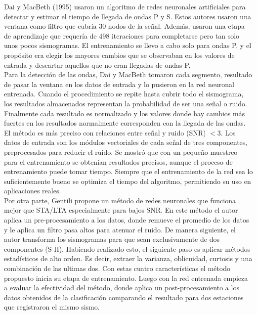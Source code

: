 \documentclass[../main.tex]{subfiles}
\begin{document}
Dai y MacBeth (1995) usaron un algoritmo de redes neuronales artificiales para detectar y estimar el tiempo de llegada de ondas P y S. Estos autores usaron una ventana como filtro que cubría 30 nodos de la señal. Además, usaron una etapa de aprendizaje que requería de 498 iteraciones para completarse pero tan solo unos pocos sismogramas. El entrenamiento se llevo a cabo solo para ondas P, y el propósito era elegir los mayores cambios que se observaban en los valores de entrada y descartar aquellos que no eran llegadas de ondas P. \\

Para la detección de las ondas, Dai y MacBeth tomaron cada segmento, resultado de pasar la ventana en los datos de entrada y lo pusieron en la red neuronal entrenada. Cuando el procedimiento se repite hasta cubrir todo el sismograma, los resultados almacenados representan la probabilidad de ser una señal o ruido. Finalmente cada resultado es normalizado y los valores donde hay cambios más fuertes en los resultados normalmente corresponden con la llegada de las ondas. El método es más preciso con relaciones entre señal y ruido (SNR) $<3$. Los datos de entrada son los módulos vectoriales de cada señal de tres componentes, preprocesados para reducir el ruido. Se mostró que con un pequeño muestreo para el entrenamiento se obtenían resultados precisos, aunque el proceso de entrenamiento puede tomar tiempo. Siempre que el entrenamiento de la red sea lo suficientemente bueno se optimiza el tiempo del algoritmo, permitiendo su uso en aplicaciones reales. \\

Por otra parte, Gentili propone un método de redes neuronales que funciona mejor que STA/LTA especialmente para bajos SNR. En este método el autor aplica un pre-procesamiento a los datos, donde remueve el promedio de los datos y le aplica un filtro pasa altos para atenuar el ruido. De manera siguiente, el autor transforma los sismogramas para que sean exclusivamente de dos componentes (S-H). Habiendo realizado esto, el siguiente paso es aplicar métodos estadísticos de alto orden. Es decir, extraer la varianza, oblicuidad, curtosis y una combinación de las ultimas dos. Con estas cuatro características el método propuesto inicia su etapa de entrenamiento. Luego con la red entrenada empieza a evaluar la efectividad del método, donde aplica un post-procesamiento a los datos obtenidos de la clasificación comparando el resultado para dos estaciones que registraron el mismo sismo.\\
\end{document}
